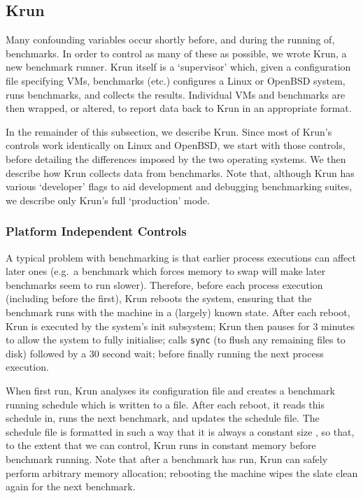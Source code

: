 \documentclass[preprint,numbers,10pt]{sigplanconf}
\newcommand{\krun}{Krun\xspace}
\begin{document}
\subsection{\krun}
\label{krun}

Many confounding variables occur shortly before, and during the running of,
benchmarks. In order to control as many of these as possible, we wrote
\krun, a new benchmark runner. \krun itself is a `supervisor'
which, given a configuration file specifying VMs, benchmarks (etc.) configures
a Linux or OpenBSD system, runs benchmarks, and collects the results. Individual VMs and benchmarks
are then wrapped, or altered, to report data back to \krun in an appropriate format.

In the remainder of this subsection, we describe \krun. Since most of \krun's
controls work identically on Linux and OpenBSD, we start with those controls,
before detailing the differences imposed by the two operating systems. We then
describe how \krun collects data from benchmarks.
Note that, although \krun has various `developer' flags to aid development
and debugging benchmarking suites, we describe only \krun's full `production' mode.


\subsubsection{Platform Independent Controls}

A typical problem with benchmarking is that earlier process executions can
affect later ones (e.g.~a benchmark which forces memory to swap will make
later benchmarks seem to run slower). Therefore, before each process execution
(including before the first), \krun reboots the system, ensuring that the
benchmark runs with the machine in a (largely) known state. After each reboot, \krun is
executed by the system's init subsystem; \krun then pauses for 3
minutes to allow the system to fully initialise; calls \texttt{sync} (to
flush any remaining files to disk) followed by a 30 second wait; before finally running the
next process execution.

When first run, \krun analyses its configuration file and creates a benchmark
running schedule which is written to a file. After each reboot, it reads this
schedule in, runs the next benchmark, and updates the schedule file. The
schedule file is formatted in such a way that it is always a constant size
, so that, to the extent that we can control, \krun runs in
constant memory before benchmark running. Note that after a benchmark has run,
\krun can safely perform arbitrary memory allocation; rebooting the machine
wipes the slate clean again for the next benchmark.
\end{document}
